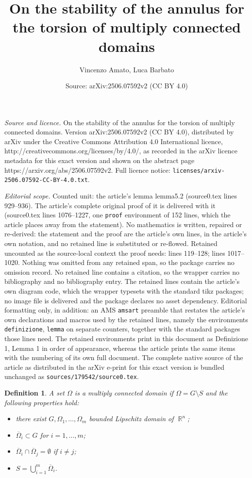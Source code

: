 \documentclass[10pt,a4paper]{amsart}
\title{On the stability of the annulus for the torsion of multiply connected domains}
\author{Vincenzo Amato, Luca Barbato}
\date{Source: arXiv:2506.07592v2 (CC BY 4.0)}
\newtheorem{definizione}{Definition}
\DeclareMathOperator{\R}{\mathbb{R}}
\begin{document}
\maketitle

\noindent\emph{Source and licence.} On the stability of the annulus for the torsion of multiply connected domains. Version arXiv:2506.07592v2 (CC BY 4.0), distributed by arXiv under the Creative Commons Attribution 4.0 International licence, http://creativecommons.org/licenses/by/4.0/, as recorded in the arXiv licence metadata for this exact version and shown on the abstract page https://arxiv.org/abs/2506.07592v2. Full licence notice: \texttt{licenses/arxiv-2506.07592-CC-BY-4.0.txt}.\par\smallskip

\noindent\textit{Editorial scope.} Counted unit: the article's lemma lemma5.2 (source0.tex lines 929--936). The article's complete original proof of it is delivered with it (source0.tex lines 1076--1227, one \texttt{proof} environment of 152 lines, which the article places away from the statement). No mathematics is written, repaired or re-derived: the statement and the proof are the article's own lines, in the article's own notation, and no retained line is substituted or re-flowed.  Retained uncounted as the source-local context the proof needs: lines 119--128; lines 1017--1020.  Nothing was omitted from any retained span, so the package carries no omission record.  No retained line contains a citation, so the wrapper carries no bibliography and no bibliography entry.  The retained lines contain the article's own diagram code, which the wrapper typesets with the standard tikz packages; no image file is delivered and the package declares no asset dependency.  Editorial formatting only, in addition: an AMS \texttt{amsart} preamble that restates the article's own declarations and macros used by the retained lines, namely the environments \texttt{definizione}, \texttt{lemma} on separate counters, together with the standard packages those lines need.  The retained environments print in this document as Definizione 1, Lemma 1 in order of appearance, whereas the article prints the same items with the numbering of its own full document.  The complete native source of the article as distributed in the arXiv e-print for this exact version is bundled unchanged as \texttt{sources/179542/source0.tex}.
\begin{definizione}
    \label{multiplyconnected}
    A set $\Omega$ is a multiply connected domain if  $\Omega=G\setminus S$ and the following properties hold:
\begin{itemize}
    \item[\emph{(i)}] there exist $G,\Omega_1,\dots,\Omega_m$ bounded Lipschitz domain of $\R^n$; 
    \item[\emph{(ii)}] $\overline{\Omega}_i\subset G$ for $i=1,\dots,m$;
    \item[\emph{(iii)}]$\overline{\Omega}_i\cap\overline{\Omega}_j=\emptyset$ if $i\neq j$;
    \item[\emph{(iv)}]$S=\bigcup\limits_{i=1}^m\overline{\Omega}_i$.    
\end{itemize}
\end{definizione}
\end{document}
